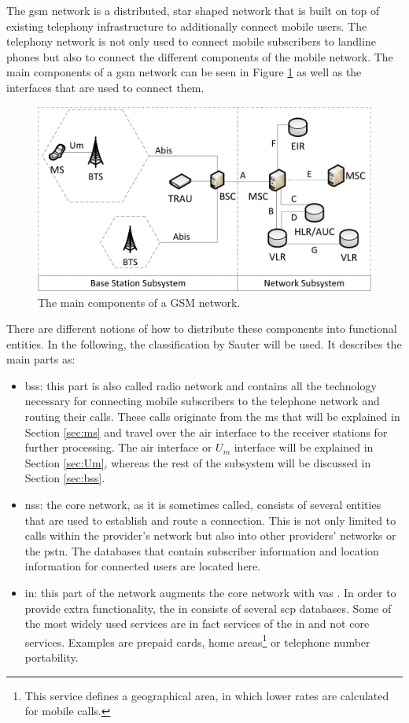 The \gls{gsm} network is a distributed, star shaped network that is built on top of existing telephony infrastructure to additionally connect mobile users.
The telephony network is not only used to connect mobile subscribers to landline phones but also to connect the different components of the mobile network.
The main components of a \gls{gsm} network can be seen in Figure \ref{fig:gsm_network} as well as the interfaces that are used to connect them.
\begin{figure}
\centering
\includegraphics{../Images/Architecture}
\caption{The main components of a GSM network.}
\label{fig:gsm_network}
\end{figure}
There are different notions of how to distribute these components into functional entities.
In the following, the classification by Sauter \cite{kommsys2006} will be used.
It describes the main parts as:
\begin{itemize}
	\item \gls{bss}: this part is also called radio network and contains all the technology necessary for connecting mobile subscribers to the telephone network and routing their calls. 
	These calls originate from the \gls{ms} that will be explained in Section \ref{sec:ms} and travel over the air interface to the receiver stations for further processing.
	The air interface or $U_m$ interface will be explained in Section \ref{sec:Um}, whereas the rest of the subsystem will be discussed in Section \ref{sec:bss}.
	\item \gls{nss}: the core network, as it is sometimes called, consists of several entities that are used to establish and route a connection.
	This is not only limited to calls within the provider's network but also into other providers' networks or the \gls{pstn}.
	The databases that contain subscriber information and location information for connected users are located here.
	\item \gls{in}: this part of the network augments the core network with \gls{vas} \cite{ITU1200}.
	In order to provide extra functionality, the \gls{in} consists of several \gls{scp} databases.
	Some of the most widely used services are in fact services of the \gls{in} and not core services.
	Examples are prepaid cards, home areas\footnote{This service defines a geographical area, in which lower rates are calculated for mobile calls.} or telephone number portability.
\end{itemize}
